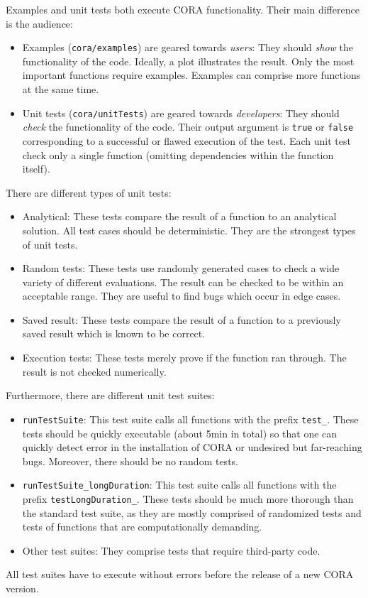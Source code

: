 
Examples and unit tests both execute CORA functionality.
Their main difference is the audience:
\begin{itemize}
	\item Examples (\verb|cora/examples|) are geared towards \emph{users}:
		They should \emph{show} the functionality of the code.
		Ideally, a plot illustrates the result.
		Only the most important functions require examples.
		Examples can comprise more functions at the same time.
	\item Unit tests (\verb|cora/unitTests|) are geared towards \emph{developers}:
		They should \emph{check} the functionality of the code.
		Their output argument is \verb|true| or \verb|false| corresponding to a successful or flawed execution of the test.
		Each unit test check only a single function (omitting dependencies within the function itself).
\end{itemize}

There are different types of unit tests:
\begin{itemize}
	\item Analytical:
		These tests compare the result of a function to an analytical solution.
		All test cases should be deterministic.
		They are the strongest types of unit tests.
	\item Random tests:
		These tests use randomly generated cases to check a wide variety of different evaluations.
		The result can be checked to be within an acceptable range.
		They are useful to find bugs which occur in edge cases.
	\item Saved result:
		These tests compare the result of a function to a previously saved result which is known to be correct.
	\item Execution tests:
		These tests merely prove if the function ran through.
		The result is not checked numerically.
\end{itemize}

Furthermore, there are different unit test suites:
\begin{itemize}
	\item \verb|runTestSuite|:
		This test suite calls all functions with the prefix \verb|test_|.
		These tests should be quickly executable (about 5min in total) so that one can quickly detect error in the installation of CORA or undesired but far-reaching bugs.
		Moreover, there should be no random tests.
	\item \verb|runTestSuite_longDuration|:
		This test suite calls all functions with the prefix \verb|testLongDuration_|.
		These tests should be much more thorough than the standard test suite, as they are mostly comprised of randomized tests and tests of functions that are computationally demanding.
	\item Other test suites:
		They comprise tests that require third-party code.
\end{itemize}

All test suites have to execute without errors before the release of a new CORA version.